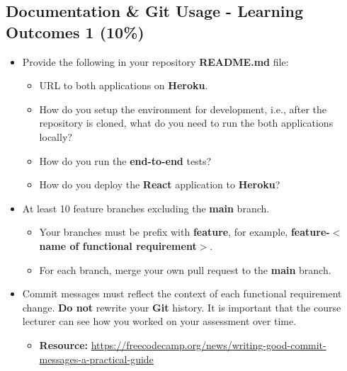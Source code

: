 \documentclass{article}
\begin{document}
\subsection*{Documentation \& Git Usage - Learning Outcomes 1 (10\%)}
\begin{itemize}
	\item Provide the following in your repository \textbf{README.md} file:
	      \begin{itemize}
		      \item URL to both applications on \textbf{Heroku}.
		      \item How do you setup the environment for development, i.e., after the repository is cloned, what do you need to run the both applications locally?
					\item How do you run the \textbf{end-to-end} tests?
					\item How do you deploy the \textbf{React} application to \textbf{Heroku}?
	      \end{itemize}
			\end{itemize}
			\begin{itemize}
	\item At least 10 feature branches excluding the \textbf{main} branch.
	\begin{itemize}
			\item Your branches must be prefix with \textbf{feature}, for example, \textbf{feature-$<$name of functional requirement$>$}.
			\item For each branch, merge your own pull request to the \textbf{main} branch.
	\end{itemize}
	\item Commit messages must reflect the context of each functional requirement change. \textbf{Do not} rewrite your \textbf{Git} history. It is important that the course lecturer can see how you worked on your assessment over time.
	      \begin{itemize}
		      \item \textbf{Resource:} \footnotesize\href{https://freecodecamp.org/news/writing-good-commit-messages-a-practical-guide}{https://freecodecamp.org/news/writing-good-commit-messages-a-practical-guide}
	      \end{itemize}
\end{itemize}
\end{document}
